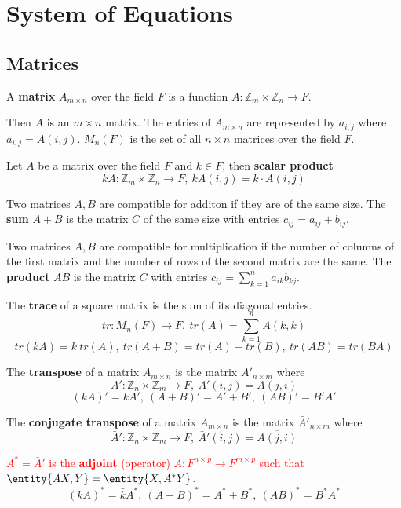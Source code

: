 \section{System of Equations}
\subsection{Matrices}
\begin{definition}
	A \textbf{matrix} $A_{m \times n}$ over the field $F$ is a function $A : \mathbb{Z}_m \times \mathbb{Z}_n \to F$.
\end{definition}
	Then $A$ is an $m \times n$ matrix.
	The entries of $A_{m \times n}$ are represented by $a_{i,j}$ where $a_{i,j} = A(i,j)$.
	$M_n(F)$ is the set of all $n \times n$ matrices over the field $F$.

\begin{definition}
	Let $A$ be a matrix over the field $F$ and $k \in F$, then \textbf{scalar product}
	$$kA : \mathbb{Z}_m \times \mathbb{Z}_n \to F,\ kA(i,j) = k \cdot A(i,j)$$
\end{definition}

\begin{definition}
	Two matrices $A,B$ are compatible for additon if they are of the same size.
	The \textbf{sum} $A+B$ is the matrix $C$ of the same size with entries $c_{ij} = a_{ij} + b_{ij}$.
\end{definition}

\begin{definition}
	Two matrices $A,B$ are compatible for multiplication if the number of columns of the first matrix and the number of rows of the second matrix are the same.
	The \textbf{product} $AB$ is the matrix $C$ with entries
	$ c_{ij} = \sum_{k=1}^n a_{ik}b_{kj}$.
\end{definition}
\begin{definition}
	The \textbf{trace} of a square matrix is the sum of its diagonal entries.
	$$ tr : M_n(F) \to F,\ tr(A) = \sum_{k=1}^n A(k,k) $$
	$$tr(kA) = k\ tr(A),\ tr(A+B) = tr(A) + tr(B),\ tr(AB) = tr(BA)$$
\end{definition}

\begin{definition}
	The \textbf{transpose} of a matrix $A_{m \times n}$ is the matrix $A'_{n \times m}$ where
		$$A' : \mathbb{Z}_n \times \mathbb{Z}_m \to F,\ A'(i,j) = A(j,i)$$
		$$(kA)'=kA',\ (A+B)'=A'+B',\ (AB)'=B'A'$$
\end{definition}

\begin{definition}
	The \textbf{conjugate transpose} of a matrix $A_{m \times n}$ is the matrix $\bar{A}'_{n \times m}$ where
		$$\bar{A}' : \mathbb{Z}_n \times \mathbb{Z}_m \to F,\ \bar{A}'(i,j) = \overline{A(j,i)}$$
\end{definition}
	\textcolor{red}{$A^\ast = \bar{A}'$ is the \textbf{adjoint} (operator) $A : F^{n \times p} \to F^{m \times p}$ such that $\entity{AX,Y} = \entity{X,A^\ast Y}$.}
	$$(kA)^\ast = \bar{k}A^\ast,\ (A+B)^\ast = A^\ast + B^\ast,\ (AB)^\ast = B^\ast A^\ast$$

